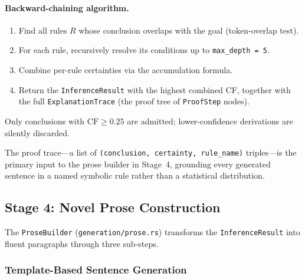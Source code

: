 \documentclass[11pt,a4paper]{article}
\begin{document}
\paragraph{Backward-chaining algorithm.}
\begin{enumerate}[noitemsep,topsep=4pt]
  \item Find all rules $R$ whose conclusion overlaps with the goal (token-overlap test).
  \item For each rule, recursively resolve its conditions up to \texttt{max\_depth = 5}.
  \item Combine per-rule certainties via the accumulation formula.
  \item Return the \texttt{InferenceResult} with the highest combined CF, together with
        the full \texttt{ExplanationTrace} (the proof tree of \texttt{ProofStep} nodes).
\end{enumerate}
Only conclusions with $\mathrm{CF} \geq 0.25$ are admitted; lower-confidence derivations are
silently discarded.

The proof trace---a list of \texttt{(conclusion, certainty, rule\_name)} triples---is the
primary input to the prose builder in Stage~4, grounding every generated sentence in a named
symbolic rule rather than a statistical distribution.

\subsection{Stage 4: Novel Prose Construction}
\label{sec:prose}

The \texttt{ProseBuilder} (\texttt{generation/prose.rs}) transforms the \texttt{InferenceResult}
into fluent paragraphs through three sub-steps.

\subsubsection{Template-Based Sentence Generation}
\end{document}
